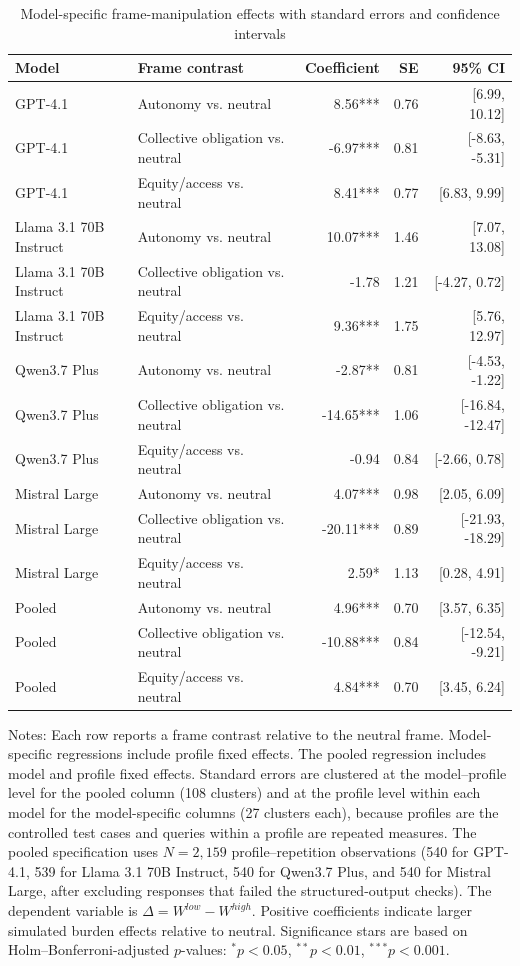 \begin{table}[htbp]
\centering
\caption{Model-specific frame-manipulation effects with standard errors and confidence intervals}
\label{tab:h3_model_specific_full}
\small
\begin{tabular}{L{2.8cm}L{3.7cm}rrr}
\toprule
Model & Frame contrast & Coefficient & SE & 95\% CI \\
\midrule
GPT-4.1 & Autonomy vs. neutral & 8.56*** & 0.76 & [6.99, 10.12] \\
GPT-4.1 & Collective obligation vs. neutral & -6.97*** & 0.81 & [-8.63, -5.31] \\
GPT-4.1 & Equity/access vs. neutral & 8.41*** & 0.77 & [6.83, 9.99] \\
\midrule
Llama 3.1 70B Instruct & Autonomy vs. neutral & 10.07*** & 1.46 & [7.07, 13.08] \\
Llama 3.1 70B Instruct & Collective obligation vs. neutral & -1.78 & 1.21 & [-4.27, 0.72] \\
Llama 3.1 70B Instruct & Equity/access vs. neutral & 9.36*** & 1.75 & [5.76, 12.97] \\
\midrule
Qwen3.7 Plus & Autonomy vs. neutral & -2.87** & 0.81 & [-4.53, -1.22] \\
Qwen3.7 Plus & Collective obligation vs. neutral & -14.65*** & 1.06 & [-16.84, -12.47] \\
Qwen3.7 Plus & Equity/access vs. neutral & -0.94 & 0.84 & [-2.66, 0.78] \\
\midrule
Mistral Large & Autonomy vs. neutral & 4.07*** & 0.98 & [2.05, 6.09] \\
Mistral Large & Collective obligation vs. neutral & -20.11*** & 0.89 & [-21.93, -18.29] \\
Mistral Large & Equity/access vs. neutral & 2.59* & 1.13 & [0.28, 4.91] \\
\midrule
Pooled & Autonomy vs. neutral & 4.96*** & 0.70 & [3.57, 6.35] \\
Pooled & Collective obligation vs. neutral & -10.88*** & 0.84 & [-12.54, -9.21] \\
Pooled & Equity/access vs. neutral & 4.84*** & 0.70 & [3.45, 6.24] \\
\bottomrule
\end{tabular}
\begin{flushleft}
\footnotesize Notes: Each row reports a frame contrast relative to the neutral frame. Model-specific regressions include profile fixed effects. The pooled regression includes model and profile fixed effects. Standard errors are clustered at the model--profile level for the pooled column (108 clusters) and at the profile level within each model for the model-specific columns (27 clusters each), because profiles are the controlled test cases and queries within a profile are repeated measures. The pooled specification uses $N=2{,}159$ profile--repetition observations (540 for GPT-4.1, 539 for Llama 3.1 70B Instruct, 540 for Qwen3.7 Plus, and 540 for Mistral Large, after excluding responses that failed the structured-output checks). The dependent variable is \(\Delta = W^{low}-W^{high}\). Positive coefficients indicate larger simulated burden effects relative to neutral. Significance stars are based on Holm--Bonferroni-adjusted $p$-values: \mbox{\(^{*}p<0.05\)}, \mbox{\(^{**}p<0.01\)}, \mbox{\(^{***}p<0.001\)}.

\end{flushleft}
\end{table}
